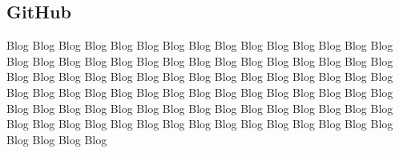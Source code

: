 \subsection{GitHub}

Blog Blog Blog Blog Blog Blog Blog Blog Blog Blog Blog Blog Blog Blog Blog Blog Blog Blog Blog 
Blog Blog Blog Blog Blog Blog Blog Blog Blog Blog Blog Blog Blog Blog Blog Blog Blog Blog Blog Blog Blog 
Blog Blog Blog Blog Blog Blog Blog Blog Blog Blog Blog Blog Blog Blog Blog Blog Blog Blog Blog Blog 
Blog Blog Blog Blog Blog Blog Blog Blog Blog Blog Blog Blog Blog Blog Blog Blog Blog 
Blog Blog Blog Blog Blog Blog Blog Blog Blog Blog Blog Blog Blog Blog Blog Blog Blog 

